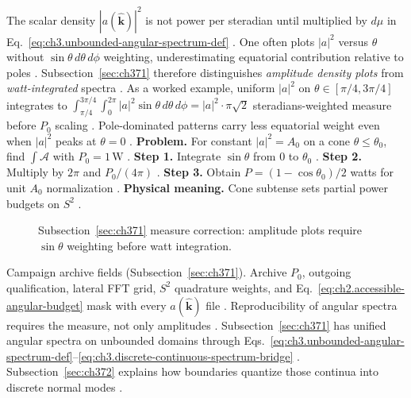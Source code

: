 The scalar density \(|a(\widehat{\mathbf{k}})|^{2}\) is not power per steradian until multiplied by \(d\mu\) in
Eq.~\eqref{eq:ch3.unbounded-angular-spectrum-def} \cite{jackson1999}. One often plots \(|a|^{2}\) versus
\(\theta\) without \( \sin\theta\,d\theta\,d\phi\) weighting, underestimating equatorial contribution relative to poles
\cite{harrington2001}. Subsection~\ref{sec:ch371} therefore distinguishes \emph{amplitude density plots}
from \emph{watt-integrated} spectra \cite{poynting1884}.
As a worked example, uniform \(|a|^{2}\) on \(\theta\in[\pi/4,3\pi/4]\) integrates to \(\int_{\pi/4}^{3\pi/4}\int_{0}^{2\pi}|a|^{2}\sin\theta\,d\theta\,d\phi
= |a|^{2}\cdot\pi\sqrt{2}\) steradians-weighted measure before \(P_{0}\) scaling \cite{jackson1999}. Pole-dominated
patterns carry less equatorial weight even when \(|a|^{2}\) peaks at \(\theta=0\) \cite{stratton1941}.
\textbf{Problem.} For constant \(|a|^{2}=A_{0}\) on a cone \(\theta\le\theta_{0}\), find \(\int\mathcal{A}\) with \(P_{0}=1\,\mathrm{W}\)
\cite{jackson1999}.
\textbf{Step 1.} Integrate \(\sin\theta\) from \(0\) to \(\theta_{0}\) \cite{jackson1999}.
\textbf{Step 2.} Multiply by \(2\pi\) and \(P_{0}/(4\pi)\) \cite{poynting1884}.
\textbf{Step 3.} Obtain \(P=(1-\cos\theta_{0})/2\) watts for unit \(A_{0}\) normalization \cite{harrington2001}.
\textbf{Physical meaning.} Cone subtense sets partial power budgets on \(S^{2}\) \cite{stratton1941}.
\begin{figure}[t]
\centering
{}
\caption{Subsection~\ref{sec:ch371} measure correction: amplitude plots require \(\sin\theta\) weighting before watt integration.}
\label{fig:ch3.371-sintheta-weight}
\end{figure}
Campaign archive fields (Subsection~\ref{sec:ch371}). Archive \(P_{0}\), outgoing qualification, lateral FFT grid, \(S^{2}\) quadrature weights, and
Eq.~\eqref{eq:ch2.accessible-angular-budget} mask with every \(a(\widehat{\mathbf{k}})\) file
\cite{harrington2001}. Reproducibility of angular spectra requires the measure, not only amplitudes
\cite{harrington2001}.
Subsection~\ref{sec:ch371} has unified angular spectra on unbounded domains through
Eqs.~\eqref{eq:ch3.unbounded-angular-spectrum-def}--\eqref{eq:ch3.discrete-continuous-spectrum-bridge}
\cite{jackson1999}. Subsection~\ref{sec:ch372} explains how boundaries quantize those continua
into discrete normal modes \cite{hansen1988}.
